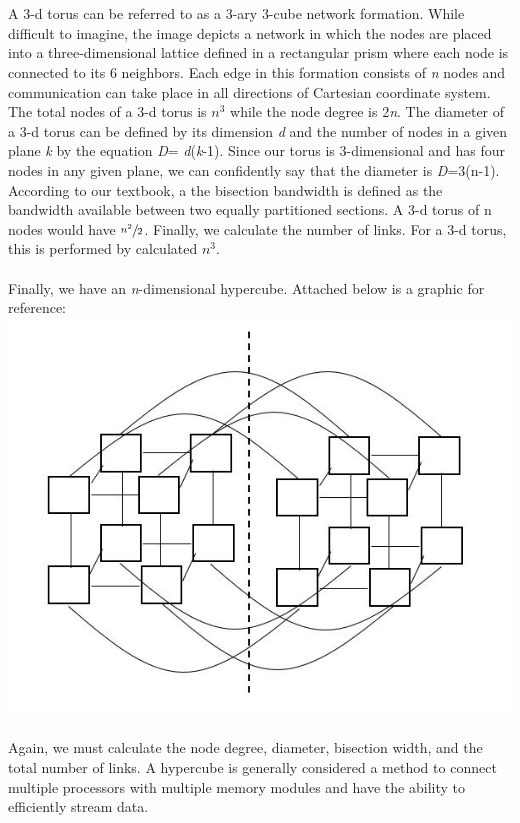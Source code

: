 \documentclass{article}
\begin{document}
\\ \\
A 3-d torus can be referred to as a 3-ary 3-cube network formation. While difficult to imagine, the image depicts a network in which the nodes are placed into a three-dimensional lattice defined in a rectangular prism where each node is connected to its 6 neighbors. Each edge in this formation consists of \textit{n} nodes and communication can take place in all directions of Cartesian coordinate system. The total nodes of a 3-d torus is \textit{$n^3$} while the node degree is 2\textit{n}. The diameter of a 3-d torus can be defined by its dimension \textit{d} and the number of nodes in a given plane \textit{k} by the equation \textit{D}= \textit{d}(\textit{k}-1). Since our torus is 3-dimensional and has four nodes in any given plane, we can confidently say that the diameter is \textit{D}=3(n-1). According to our textbook, a the bisection bandwidth is defined as the bandwidth available between two equally partitioned sections. A 3-d torus of n nodes would have $\sfrac{n^2}{2}$. Finally, we calculate the number of links. For a 3-d torus, this is performed by calculated \textit{$n^3$}.
\\ \\
Finally, we have an \textit{n}-dimensional hypercube. Attached below is a graphic for reference:
\\ 
\includegraphics[width=\textwidth,height=\textheight,keepaspectratio]{hypercube.jpeg}
\\ \\
Again, we must calculate the node degree, diameter, bisection width, and the total number of links. A hypercube is generally considered a method to connect multiple processors with multiple memory modules and have the ability to efficiently stream data. \\ \\ 
\end{document}
